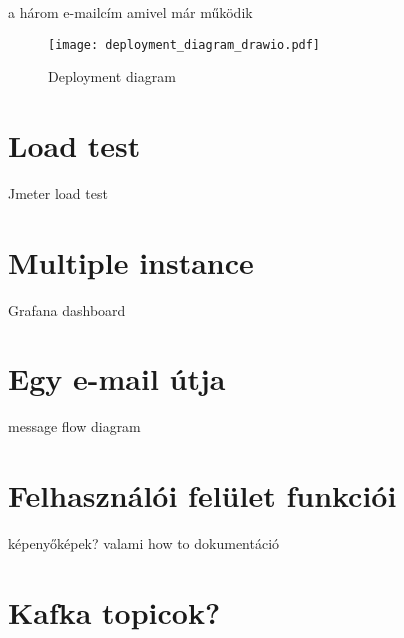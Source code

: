 a három e-mailcím amivel már működik


\begin{figure}[hbt] 
	\centering
	\texttt{[image: deployment\_diagram\_drawio.pdf]}
	\caption[Deployment diagram]{Deployment diagram}\label{fig:deployment_diagram}
\end{figure}


\section{Load test}
Jmeter load test

\section{Multiple instance}
Grafana dashboard

\section{Egy e-mail útja}
message flow diagram

\section{Felhasználói felület funkciói}
 képenyőképek? valami how to dokumentáció	

\section{Kafka topicok?}